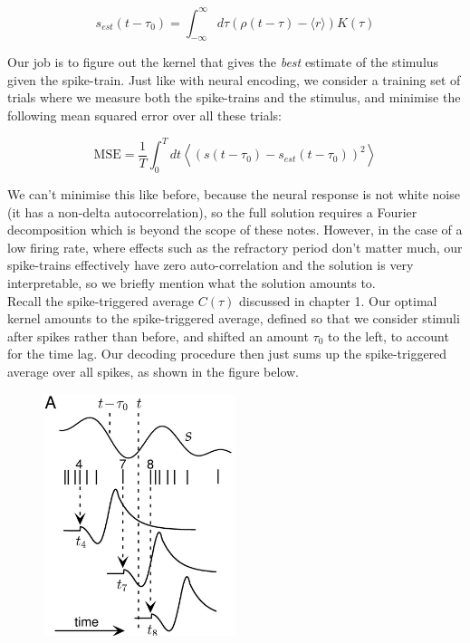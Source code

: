 \documentclass{article}
\begin{document}
\begin{equation*}
    s_{est}(t-\tau_0) = \int_{-\infty}^\infty d\tau (\rho(t-\tau)-\langle r \rangle)K(\tau)
\end{equation*}

Our job is to figure out the kernel that gives the \textit{best} estimate of the stimulus given the spike-train. Just like with neural encoding, we consider a training set of trials where we measure both the spike-trains and the stimulus, and minimise the following mean squared error over all these trials:

\begin{equation*}
    \text{MSE} = \frac{1}{T}\int_0^T dt \left\langle \left ( s(t-\tau_0) - s_{est}(t-\tau_0) \right)^2\right\rangle
\end{equation*}

We can't minimise this like before, because the neural response is not white noise (it has a non-delta autocorrelation), so the full solution requires a Fourier decomposition which is beyond the scope of these notes. However, in the case of a low firing rate, where effects such as the refractory period don't matter much, our spike-trains effectively have zero auto-correlation and the solution is very interpretable, so we briefly mention what the solution amounts to.\\

Recall the spike-triggered average $C(\tau)$ discussed in chapter 1. Our optimal kernel amounts to the spike-triggered average, defined so that we consider stimuli after spikes rather than before, and shifted an amount $\tau_0$ to the left, to account for the time lag. Our decoding procedure then just sums up the spike-triggered average over all spikes, as shown in the figure below.\\

\begin{figure}[h]
    \centering
    \includegraphics[width=0.5\textwidth]{decoding.png} %
    \label{fig:example_png}
\end{figure}
\end{document}
